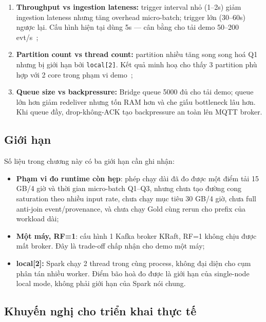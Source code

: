 \begin{enumerate}
  \item \textbf{Throughput vs ingestion lateness:} trigger interval nhỏ (1--2s)
        giảm ingestion lateness nhưng tăng overhead micro-batch; trigger lớn
        (30--60s) ngược lại. Cấu hình hiện tại dùng 5s --- cân bằng cho tải
        demo 50--200 evt/s~\cite{shufflebench_2024};
  \item \textbf{Partition count vs thread count:} partition nhiều tăng song
        song hoá Q1 nhưng bị giới hạn bởi \texttt{local[2]}. Kết quả minh hoạ
        cho thấy 3 partition phù hợp với 2 core trong phạm vi
        demo~\cite{kafka_patterns_benchmark_2025, confluent_partition_count};
  \item \textbf{Queue size vs backpressure:} Bridge queue 5000 đủ cho tải
        demo; queue lớn hơn giảm redeliver nhưng tốn RAM hơn và che giấu
        bottleneck lâu hơn. Khi queue đầy, drop-không-ACK tạo backpressure
        an toàn lên MQTT broker.
\end{enumerate}

\subsection{Giới hạn}

Số liệu trong chương này có ba giới hạn cần ghi nhận:

\begin{itemize}
  \item \textbf{Phạm vi đo runtime còn hẹp}: phép chạy dài đã đo được một
        điểm tải 15 GB/4 giờ và thời gian micro-batch Q1--Q3, nhưng chưa tạo
        đường cong saturation theo nhiều input rate, chưa chạy mục tiêu
        30 GB/4 giờ, chưa full anti-join event/provenance, và chưa chạy Gold
        cùng rerun cho prefix của workload dài;
  \item \textbf{Một máy, RF=1}: cấu hình 1 Kafka broker KRaft, RF=1 không
        chịu được mất broker. Đây là trade-off chấp nhận cho demo một máy;
  \item \textbf{local{[}2{]}:} Spark chạy 2 thread trong cùng process, không
        đại diện cho cụm phân tán nhiều worker. Điểm bão hoà đo được là giới
        hạn của single-node local mode, không phải giới hạn của Spark nói chung.
\end{itemize}

\subsection{Khuyến nghị cho triển khai thực tế}

